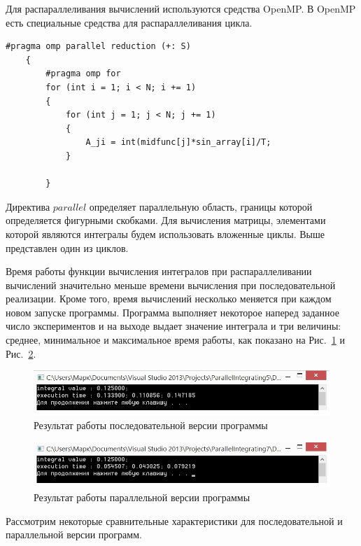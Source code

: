 \documentclass{spisok-article}
\begin{document}
Для распараллеливания вычислений используются средства
OpenMP. В OpenMP есть специальные средства для распараллеливания
цикла.

\begin{verbatim}
#pragma omp parallel reduction (+: S)
    {
        #pragma omp for
        for (int i = 1; i < N; i += 1)
        {
            for (int j = 1; j < N; j += 1)
            {
                A_ji = int(midfunc[j]*sin_array[i]/T;
            }

        }
\end{verbatim}

Директива $parallel$ определяет параллельную область, границы которой определяется фигурными скобками. Для вычисления матрицы, элементами
которой являются интегралы будем использовать вложенные циклы.
Выше представлен один из циклов.

Время работы функции вычисления интегралов  при распараллеливании вычислений значительно меньше времени вычисления  при последовательной реализации. Кроме того, время вычислений несколько меняется при каждом новом  запуске программы.  Программа выполняет некоторое наперед заданное число экспериментов и на выходе выдает значение интеграла и три величины:     среднее, минимальное и максимальное время работы, как показано на Рис.~\ref{ris1:image} и Рис.~\ref{ris2:image}.

\begin{figure}[h]
	\includegraphics[width=1\linewidth]{paral1.jpg}
	\caption{Результат работы последовательной версии программы}
	\label{ris1:image}
\end{figure}

\begin{figure}[h]
	\includegraphics[width=1\linewidth]{paral2.jpg}
	\caption{Результат работы параллельной версии программы}
	\label{ris2:image}
\end{figure}

Рассмотрим некоторые сравнительные характеристики для последовательной и параллельной версии программ.
\end{document}
